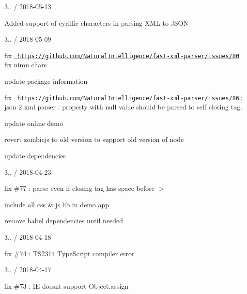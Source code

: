 3.. / 2018-\/05-\/13
\begin{DoxyItemize}
\item Added support of cyrillic characters in parsing XML to JSON
\end{DoxyItemize}

3.. / 2018-\/05-\/09
\begin{DoxyItemize}
\item fix \href{https://github.com/NaturalIntelligence/fast-xml-parser/issues/80}{\texttt{ https\+://github.\+com/\+Natural\+Intelligence/fast-\/xml-\/parser/issues/80}} fix nimn chars
\item update package information
\item fix \href{https://github.com/NaturalIntelligence/fast-xml-parser/issues/86:}{\texttt{ https\+://github.\+com/\+Natural\+Intelligence/fast-\/xml-\/parser/issues/86\+:}} json 2 xml parser \+: property with null value should be parsed to self closing tag.
\item update online demo
\item revert zombiejs to old version to support old version of node
\item update dependencies
\end{DoxyItemize}

3.. / 2018-\/04-\/23
\begin{DoxyItemize}
\item fix \#77 \+: parse even if closing tag has space before \textquotesingle{}\texorpdfstring{$>$}{>}\textquotesingle{}
\item include all css \& js lib in demo app
\item remove babel dependencies until needed
\end{DoxyItemize}

3.. / 2018-\/04-\/18
\begin{DoxyItemize}
\item fix \#74 \+: TS2314 Type\+Script compiler error
\end{DoxyItemize}

3.. / 2018-\/04-\/17
\begin{DoxyItemize}
\item fix \#73 \+: IE doesn\textquotesingle{}t support Object.\+assign
\end{DoxyItemize}

